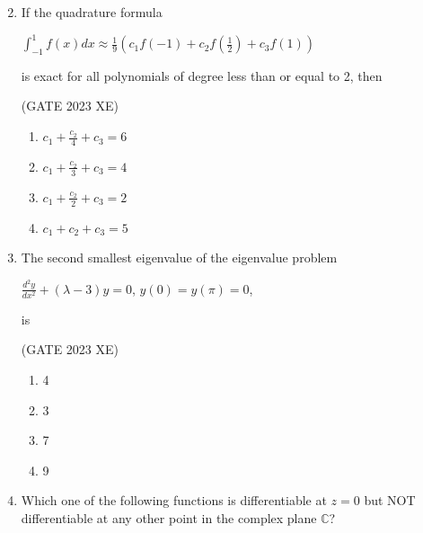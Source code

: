 \documentclass[journal,12pt,onecolumn]{IEEEtran}
\begin{document}
\begin{enumerate}
\begin{multicols}{2}
\end{multicols}

\item If the quadrature formula

$\int_{-1}^1 f(x) dx \approx \frac{1}{9}\left(c_1 f(-1) + c_2 f(\frac{1}{2}) + c_3 f(1)\right)$

is exact for all polynomials of degree less than or equal to 2, then

\hfill{(GATE 2023 XE)}

\begin{multicols}{2}

\begin{enumerate}

\item $c_1 + \frac{c_2}{4} + c_3 = 6$

\item $c_1 + \frac{c_2}{3} + c_3 = 4$

\item $c_1 + \frac{c_2}{2} + c_3 = 2$

\item $c_1 + c_2 + c_3 = 5$

\end{enumerate}

\end{multicols}

\item The second smallest eigenvalue of the eigenvalue problem

$\frac{d^2 y}{d x^2} + (\lambda - 3) y = 0$, $y(0) = y(\pi) = 0$,

is

\hfill{(GATE 2023 XE)}

\begin{multicols}{2}

\begin{enumerate}

\item 4

\item 3

\item 7

\item 9

\end{enumerate}

\end{multicols}

\item Which one of the following functions is differentiable at $z=0$ but NOT
differentiable at any other point in the complex plane $\mathbb{C}$?


\end{enumerate}
\end{document}
